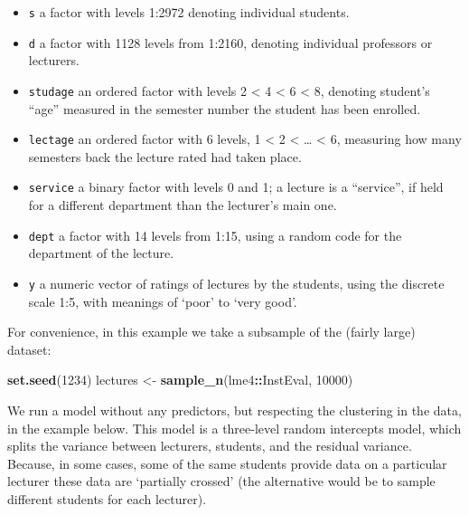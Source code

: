 \documentclass[]{article}
\newenvironment{Shaded}{\begin{snugshade}}{\end{snugshade}}
\newcommand{\DecValTok}[1]{\textcolor[rgb]{0.00,0.00,0.81}{#1}}
\newcommand{\KeywordTok}[1]{\textcolor[rgb]{0.13,0.29,0.53}{\textbf{#1}}}
\newcommand{\NormalTok}[1]{#1}
\newcommand{\OperatorTok}[1]{\textcolor[rgb]{0.81,0.36,0.00}{\textbf{#1}}}
\newcommand{\StringTok}[1]{\textcolor[rgb]{0.31,0.60,0.02}{#1}}
\begin{document}
\begin{itemize}
\item
  \texttt{s} a factor with levels 1:2972 denoting individual students.
\item
  \texttt{d} a factor with 1128 levels from 1:2160, denoting individual professors or
  lecturers.
\item
  \texttt{studage} an ordered factor with levels 2 \textless{} 4 \textless{} 6 \textless{} 8, denoting student's
  ``age'' measured in the semester number the student has been enrolled.
\item
  \texttt{lectage} an ordered factor with 6 levels, 1 \textless{} 2 \textless{} \ldots{} \textless{} 6, measuring how
  many semesters back the lecture rated had taken place.
\item
  \texttt{service} a binary factor with levels 0 and 1; a lecture is a ``service'', if
  held for a different department than the lecturer's main one.
\item
  \texttt{dept} a factor with 14 levels from 1:15, using a random code for the
  department of the lecture.
\item
  \texttt{y} a numeric vector of ratings of lectures by the students, using the
  discrete scale 1:5, with meanings of `poor' to `very good'.
\end{itemize}

For convenience, in this example we take a subsample of the (fairly large)
dataset:

\begin{Shaded}
\begin{Highlighting}[]
\KeywordTok{set.seed}\NormalTok{(}\DecValTok{1234}\NormalTok{)}
\NormalTok{lectures <-}\StringTok{ }\KeywordTok{sample_n}\NormalTok{(lme4}\OperatorTok{::}\NormalTok{InstEval, }\DecValTok{10000}\NormalTok{)}
\end{Highlighting}
\end{Shaded}

We run a model without any predictors, but respecting the clustering in the
data, in the example below. This model is a three-level random intercepts model,
which splits the variance between lecturers, students, and the residual
variance. Because, in some cases, some of the same students provide data on a
particular lecturer these data are `partially crossed' (the alternative would be
to sample different students for each lecturer).
\end{document}
